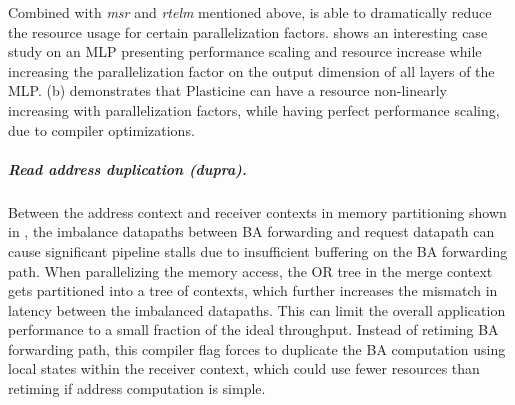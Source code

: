 Combined with \emph{msr} and \emph{rtelm} mentioned above, \name is able to 
dramatically reduce the resource usage for certain parallelization factors.
 shows an interesting case study on an MLP presenting performance scaling and resource
increase while increasing the parallelization factor on the output dimension of all layers of the
MLP.
 (b) demonstrates that Plasticine can have a resource
non-linearly increasing with parallelization factors, 
while having perfect performance scaling, due to compiler optimizations.

\subparagraph{Read address duplication (dupra).} 
Between the address context and receiver contexts in memory partitioning shown in 
,
the imbalance datapaths between BA forwarding and request datapath can cause significant pipeline
stalls due to insufficient buffering on the BA forwarding path.
When parallelizing the memory access, the OR tree in the merge context gets partitioned into a tree
of contexts, which further increases the mismatch in latency between the imbalanced datapaths.
This can limit the overall application performance to a small fraction of the ideal throughput.
Instead of retiming BA forwarding path, 
this compiler flag forces \name to duplicate the BA computation using local states
within the receiver context, which could use fewer resources than retiming if address computation is
simple.

